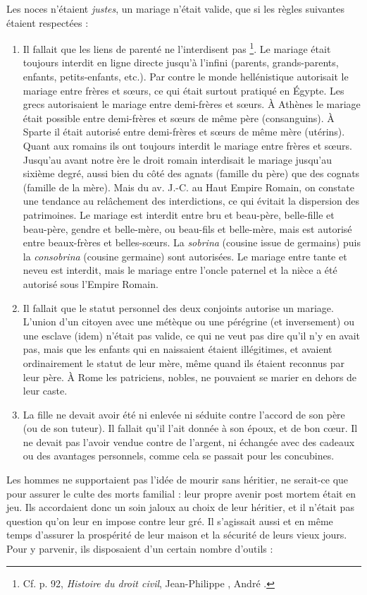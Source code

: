 Les noces n'étaient \emph{justes}, un mariage n'était valide, que si les règles
suivantes étaient respectées :
\begin{enumerate}
\item Il fallait que les liens de parenté ne l'interdisent pas%
\footnote{Cf. p. 92, \emph{Histoire du droit civil}, Jean-Philippe , André .}.
Le mariage
était toujours interdit en ligne directe jusqu'à l'infini (parents,
grands-parents, enfants, petits-enfants, etc.). Par contre le monde hellénistique
autorisait le mariage entre frères et sœurs, ce qui était surtout
pratiqué en Égypte. Les grecs autorisaient le mariage entre demi-frères et
sœurs. À Athènes le mariage était possible entre demi-frères et sœurs de
même père (consanguins). À Sparte il était autorisé entre demi-frères et
sœurs de même mère (utérins). Quant aux romains ils ont toujours interdit
le mariage entre frères et sœurs. Jusqu'au  avant notre
ère le droit romain interdisait le mariage jusqu'au sixième degré, aussi
bien du côté des agnats (famille du père) que des cognats (famille de la
mère). Mais du  av. J.-C. au Haut Empire Romain, on constate
une tendance au relâchement des interdictions, ce qui évitait la
dispersion des patrimoines. Le mariage est interdit entre bru et beau-père,
belle-fille et beau-père, gendre et belle-mère, ou beau-fils et belle-mère,
mais est autorisé entre beaux-frères et belles-sœurs. La \emph{sobrina}
(cousine issue de germains) puis la \emph{consobrina} (cousine germaine) sont
autorisées. Le mariage entre tante et neveu est interdit, mais le mariage
entre l'oncle paternel et la nièce a été autorisé sous l'Empire Romain.
\item Il fallait que le statut personnel des deux conjoints autorise un
mariage. L'union d'un citoyen avec une métèque ou une pérégrine (et inversement)
ou une esclave (idem) n'était pas valide, ce qui ne veut pas dire
qu'il n'y en avait pas, mais que les enfants qui en naissaient étaient illégitimes,
et avaient ordinairement le statut de leur mère, même quand ils
étaient reconnus par leur père. À Rome les patriciens, nobles, ne pouvaient
se marier en dehors de leur caste.
\item La fille ne devait avoir été ni enlevée ni séduite contre l'accord
de son père (ou de son tuteur). Il fallait qu'il l'ait donnée à son époux, et
de bon cœur. Il ne devait pas l'avoir vendue contre de l'argent, ni échangée
avec des cadeaux ou des avantages personnels, comme cela se passait
pour les concubines.
\end{enumerate}
Les hommes ne supportaient pas l'idée de mourir sans héritier, ne
serait-ce que pour assurer le culte des morts familial : leur propre avenir
post mortem était en jeu. Ils accordaient donc un soin jaloux au choix de
leur héritier, et il n'était pas question qu'on leur en impose contre leur
gré. Il s'agissait aussi et en même temps d'assurer la prospérité de leur
maison et la sécurité de leurs vieux jours. Pour y parvenir, ils disposaient
d'un certain nombre d'outils :

